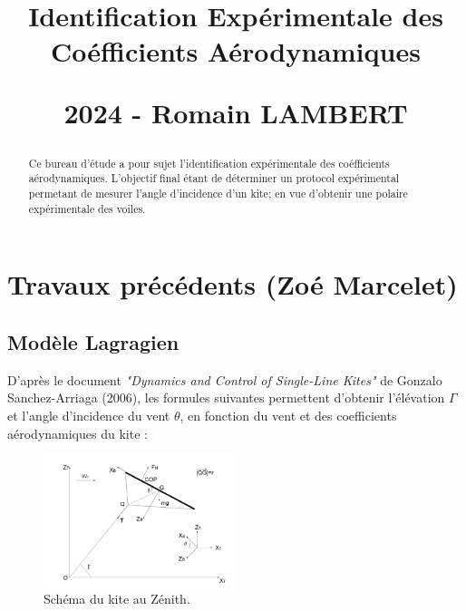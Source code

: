 \documentclass[conference]{IEEEtran}
\begin{document}
\title{\LARGE Identification Expérimentale des Coéfficients Aérodynamiques
\vskip10pt

\small 2024 - Romain LAMBERT
}
\maketitle

\begin{abstract}Ce bureau d'étude a pour sujet l'identification expérimentale des coéfficients aérodynamiques. L'objectif final étant de déterminer un protocol expérimental permetant de mesurer l'angle d'incidence d'un kite; en vue d'obtenir une polaire expérimentale des voiles. 
\end{abstract}
\IEEEoverridecommandlockouts

\IEEEpeerreviewmaketitle
\section{Travaux précédents (Zoé Marcelet)}

\subsection{Modèle Lagragien} 

D'après le document \textit{"Dynamics and Control of Single-Line Kites"} de Gonzalo Sanchez-Arriaga (2006),  les formules suivantes permettent d'obtenir l'élévation $\Gamma$ et l'angle d'incidence du vent $\theta$, en fonction du vent et des coefficients aérodynamiques du kite : \\

\begin{figure}[H]
    \centering
    \includegraphics[width=0.5\textwidth]{Pics/Picture Sanchez.png}  
    \caption{Schéma du kite au Zénith.}
    \label{fig:sanchez}
\end{figure}
\end{document}
